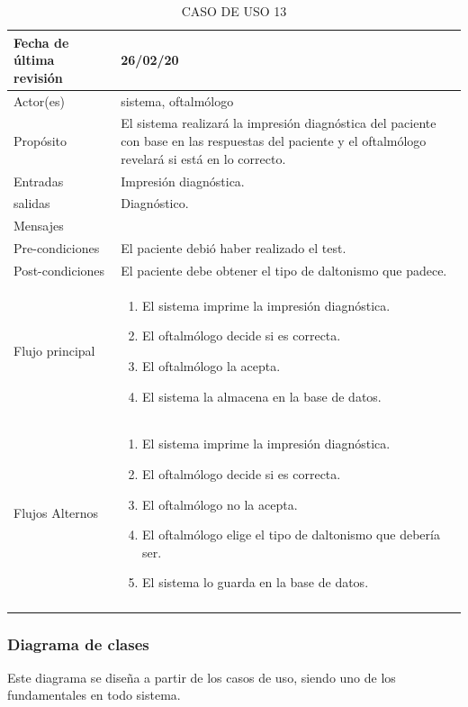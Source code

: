 \documentclass[10pt]{article}
\begin{document}
\begin{longtable}{|p{3.8cm}|p{10.8cm}|}
\hline
Fecha de última revisión & 26/02/20\\
\hline
Actor(es) & sistema, oftalmólogo\\
\hline
Propósito & El sistema realizará la impresión diagnóstica del paciente con base en las respuestas del paciente y el oftalmólogo revelará si está en lo correcto.\\
\hline
Entradas & Impresión diagnóstica.\\
\hline
salidas & Diagnóstico.\\
\hline
Mensajes & \\
\hline
Pre-condiciones & El paciente debió haber realizado el test.\\
\hline
Post-condiciones & El paciente debe obtener el tipo de daltonismo que padece.\\
\hline
Flujo principal & \begin{enumerate}
    \item El sistema imprime la impresión diagnóstica.
    \item El oftalmólogo decide si es correcta.
    \item El oftalmólogo la acepta.
    \item El sistema la almacena en la base de datos.
\end{enumerate}
    \\
\hline
Flujos Alternos & 
    \begin{enumerate}
    \item El sistema imprime la impresión diagnóstica.
    \item El oftalmólogo decide si es correcta.
    \item El oftalmólogo no la acepta.
    \item El oftalmólogo elige el tipo de daltonismo que debería ser.
    \item El sistema lo guarda en la base de datos.
\end{enumerate}
    \\
\hline
\caption{CASO DE USO 13}
\label{tabla1}
\end{longtable}

\newpage 
\subsubsection{Diagrama de clases}


Este diagrama se diseña a partir de los casos de uso, siendo uno de los fundamentales en todo sistema.
\end{document}
